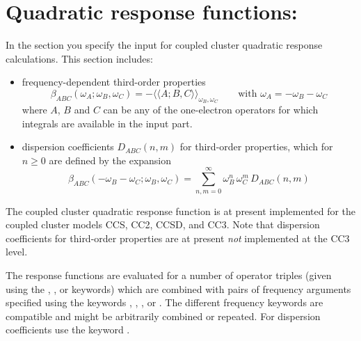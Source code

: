 
\section{Quadratic response functions: }
\label{sec:ccqr}

In the  section you  specify the input for
coupled cluster quadratic response calculations. This section
includes:
\begin{itemize}
\item frequency-dependent third-order properties
      $$\beta_{ABC}(\omega_A;\omega_B,\omega_C) = -
        \langle\langle A; B, C\rangle\rangle_{\omega_B,\omega_C} 
        \qquad \mbox{with~} \omega_A = -\omega_B - \omega_C
       $$
      where $A$, $B$ and $C$ can be any of the one-electron operators
      for which integrals are available in the  
      input part.
\item dispersion coefficients $D_{ABC}(n,m)$ for third-order properties,
      which for $n\ge 0$ are defined by the expansion
      $$ \beta_{ABC}(-\omega_B-\omega_C;\omega_B,\omega_C)  = 
        \sum_{n,m=0}^{\infty} \omega_{B}^n \, \omega_{C}^m \, D_{ABC}(n,m) 
      $$
\end{itemize}
The coupled cluster quadratic response function is at present
implemented for the coupled cluster models CCS, CC2, CCSD, and CC3.
Note that dispersion coefficients for third-order properties
are at present {\em not}\/ implemented at the CC3 level.

The response functions are evaluated for a number of 
operator triples (given using the
, , or  keywords) 
which are combined with pairs of frequency arguments specified using the 
keywords , , , 
or . 
The different frequency keywords are 
compatible and might be arbitrarily combined or repeated.
For dispersion coefficients use the keyword .

